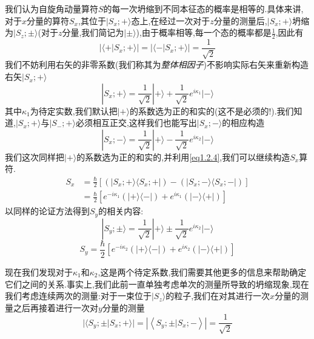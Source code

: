 \documentclass[lang=cn,newtx,10pt,scheme=chinese,thmcnt=section]{elegantbook}
\begin{document}
我们认为自旋角动量算符$S$的每一次坍缩到不同本征态的概率是相等的.具体来讲,对于$x$分量的算符$S_x$,其位于$|S_x;+\rangle$态上,在经过一次对于$z$分量的测量后,$|S_x;+\rangle$坍缩为$|S_z;\pm\rangle$(对于$z$分量,我们简记为$|\pm\rangle$),由于概率相等,每一个态的概率都是$\frac12$,因此有
\begin{equation}
	|\langle+| S_x ; +\rangle|=|\langle-| S_x ; +\rangle|=\frac{1}{\sqrt{2}}
\end{equation}
我们不妨利用右矢的非零系数(我们称其为\textit{整体相因子})不影响实际右矢来重新构造右矢$|S_x;+\rangle$
\begin{equation}
	|S_x;+\rangle=\frac{1}{\sqrt{2}}|+\rangle+\frac{1}{\sqrt{2}}e^{i\kappa_1} |-\rangle 
\end{equation}
其中$\kappa_1$为待定实数,我们默认把$|+\rangle$的系数选为正的和实的(这不是必须的!).我们知道,$|S_x;+\rangle$与$|S_-;+\rangle$必须相互正交,这样我们也能写出$|S_x;-\rangle$的相应构造
\begin{equation}
	|S_x;-\rangle=\frac{1}{\sqrt{2}}|+\rangle-\frac{1}{\sqrt{2}}e^{i\kappa_2} |-\rangle 
\end{equation}
我们这次同样把$|+\rangle$的系数选为正的和实的,并利用\ref{eq1.2.4},我们可以继续构造$S_x$算符.
\begin{equation}
	\begin{aligned}S_{x}&=\frac{\hbar}{2}[(| S_{x} ; +\rangle\langle S_{x} ; +|)-(| S_{x} ; -\rangle\langle S_{x} ; -|) ]\\&=\frac{\hbar}{2}[e^{-i\kappa_{1}}\left(|+\rangle\langle-|\right)+e^{i\kappa_{1}}\left(|-\rangle\langle+|\right)]\end{aligned}
\end{equation}
以同样的论证方法得到$S_y$的相关内容:
\begin{equation}
	|S_{y};\pm\rangle=\frac{1}{\sqrt{2}}|+\rangle\pm\frac{1}{\sqrt{2}}e^{i\kappa_{2}} |-\rangle
\end{equation}
\begin{equation}
	S_{y}=\frac{\hbar}{2}[e^{-i\kappa_{2}}(|+\rangle\langle-|)+e^{i\kappa_{2}}(|-\rangle\langle+|)]
\end{equation}

现在我们发现对于$\kappa_1$和$\kappa_2$,这是两个待定系数,我们需要其他更多的信息来帮助确定它们之间的关系.事实上,我们此前一直单独考虑单次的测量所导致的坍缩现象,现在我们考虑连续两次的测量:对于一束位于$|S_z\rangle$的粒子,我们在对其进行一次$x$分量的测量之后再接着进行一次对$y$分量的测量
\begin{equation}
	| \langle {{S}_{y}; \pm \left| {{S}_{x}; + }\rangle\right| = \left| \left\langle {{S}_{y}; \pm }|{S}_{x}; - \right\rangle \right| }= \frac{1}{\sqrt{2}}
\end{equation}
\end{document}
